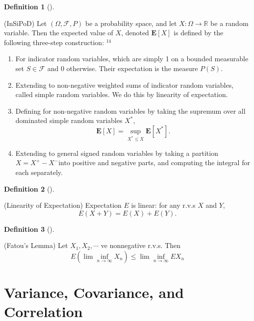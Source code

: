 \documentclass[
  letterpaper,
  DIV=11,
  numbers=noendperiod]{scrreprt}
\theoremstyle{plain}
\theoremstyle{definition}
\newtheorem{definition}{Definition}[chapter]
\theoremstyle{remark}
\begin{document}
\leavevmode{}%
\begin{definition}[]\label{def-InSiPoD}

(InSiPoD) Let \((\Omega, \mathcal{F}, P)\) be a probability space, and
let \(X: \Omega \rightarrow \mathbb{R}\) be a random variable. Then the
expected value of \(X\), denoted \(\mathbf{E}[X]\) is defined by the
following three-step construction: \({ }^{14}\)

\begin{enumerate}
\def\labelenumi{\arabic{enumi}.}
\item
  For indicator random variables, which are simply 1 on a bounded
  measurable set \(S \in \mathcal{F}\) and 0 otherwise. Their
  expectation is the measure \(P(S)\).
\item
  Extending to non-negative weighted sums of indicator random variables,
  called simple random variables. We do this by linearity of
  expectation.
\item
  Defining for non-negative random variables by taking the supremum over
  all dominated simple random variables \(X^*\), \[
  \mathbf{E}[X]=\sup _{X^* \leq X} \mathbf{E}\left[X^*\right] .
  \]
\item
  Extending to general signed random variables by taking a partition
  \(X=X^{+}-X^{-}\)into positive and negative parts, and computing the
  integral for each separately.
\end{enumerate}

\end{definition}

\leavevmode{}%
\begin{definition}[]\label{def-linearity}

(Linearity of Expectation) Expectation \(E\) is linear: for any r.v.s
\(X\) and \(Y\), \[E(X+Y)=E(X)+E(Y).\]

\end{definition}

\leavevmode{}%
\begin{definition}[]\label{def-fatou-lemma}

(Fatou's Lemma) Let \(X_1, X_2, \cdots\) ve nonnegative r.v.s. Then
\[E(\lim \inf_{n\rightarrow\infty}X_n) \leq \lim \inf_{n\rightarrow\infty}EX_n\]

\end{definition}

\hypertarget{variance-covariance-and-correlation}{%
\section*{Variance, Covariance, and
Correlation}\label{variance-covariance-and-correlation}}
\end{document}
